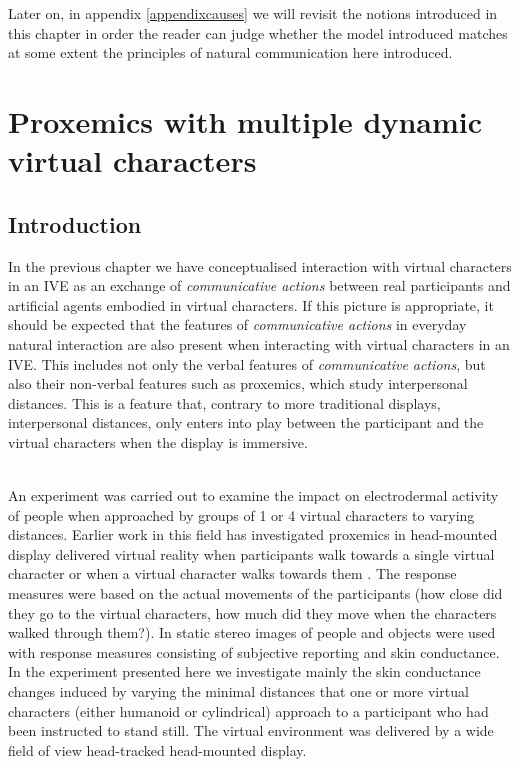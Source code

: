 \documentclass[
		twoside,openright,titlepage,numbers=noenddot,manychapters,
		headinclude,%
                footinclude=false,cleardoublepage=empty,
                BCOR=5mm,
		fontsize=11pt, %
                 enabledeprecatedfontcommands]{scrreprt}
\begin{document}
Later on, in appendix \ref{appendixcauses} we will revisit the notions introduced in this chapter  in order the reader can judge whether the model introduced matches at some extent the principles of natural communication here introduced. 
\cleardoublepage



\chapter{Proxemics with multiple dynamic virtual characters}
\thispagestyle{empty}
\label{ch_prox}


\section{Introduction}

In the previous chapter we have conceptualised interaction with virtual characters in an IVE as an exchange of \emph{communicative actions} between real participants and artificial agents embodied in virtual characters. If this picture is appropriate, it should be expected that the features of \emph{communicative actions} in everyday natural interaction are also present when interacting with virtual characters in an IVE. This includes not only the verbal features of \emph{communicative actions}, but also their non-verbal features such as proxemics, which study interpersonal distances. This is a feature that, contrary to more traditional displays, interpersonal distances, only enters into play between the participant and the virtual characters when the display is immersive.
\\ \

An experiment was carried out to examine the impact on electrodermal activity of people when approached by groups of 1 or 4 virtual characters to varying distances. %
Earlier work in this field has investigated proxemics in head-mounted display delivered virtual reality when participants walk towards a single virtual character or when a virtual character walks towards them \cite[]{bailenson2003idi, bailenson2001etr}. The response measures were based on the actual movements of the participants (how close did they go to the virtual characters, how much did they move when the characters walked through them?). In \cite[]{wilcox2006personal}  static stereo images of people and objects were used with response measures consisting of subjective reporting and skin conductance. In the experiment presented here we investigate mainly the skin conductance changes induced by varying the minimal distances that one or more virtual characters (either humanoid or cylindrical) approach to a participant who had been instructed to stand still. The virtual environment was delivered by a wide field of view head-tracked head-mounted display. 
\end{document}
